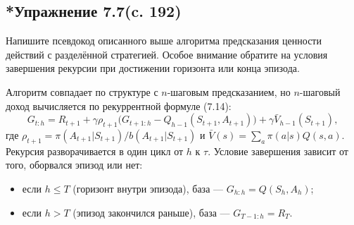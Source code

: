 \subsection{*Упражнение 7.7(c. 192)}
Напишите псевдокод описанного выше алгоритма предсказания ценности действий
с разделённой стратегией. Особое внимание обратите на условия завершения
рекурсии при достижении горизонта или конца эпизода.
\begin{solution}
    Алгоритм совпадает по структуре с $n$-шаговым предсказанием, но
    $n$-шаговый доход вычисляется по рекуррентной формуле (7.14):
    \[
    G_{t:h} = R_{t+1} + \gamma\rho_{t+1}\bigl(G_{t+1:h} - Q_{h-1}(S_{t+1}, A_{t+1})\bigr)
    + \gamma\bar V_{h-1}(S_{t+1}),
    \]
    где $\rho_{t+1} = \pi(A_{t+1}|S_{t+1})/b(A_{t+1}|S_{t+1})$ и
    $\bar V(s) = \sum_a \pi(a|s)Q(s,a)$. Рекурсия разворачивается в один цикл
    от $h$ к $\tau$. Условие завершения зависит от того, оборвался эпизод или
    нет:
    \begin{itemize}
        \item если $h \le T$ (горизонт внутри эпизода), база --- $G_{h:h} = Q(S_h, A_h)$;
        \item если $h > T$ (эпизод закончился раньше), база --- $G_{T-1:h} = R_T$.
    \end{itemize}


\end{solution}
